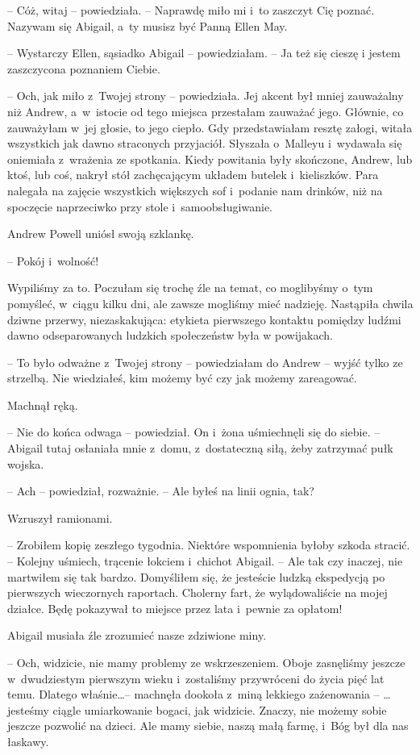 \documentclass[oneside,polish,11pt,sfheadings]{mwbk}
\begin{document}
-- Cóż, witaj -- powiedziała. -- Naprawdę miło mi i~to zaszczyt Cię poznać.
Nazywam się Abigail, a~ty musisz być Panną Ellen May.

-- Wystarczy Ellen, sąsiadko Abigail -- powiedziałam. -- Ja też się cieszę
i jestem zaszczycona poznaniem Ciebie.

-- Och, jak miło z~Twojej strony -- powiedziała. Jej akcent był mniej
zauważalny niż Andrew, a~w~istocie od tego miejsca przestałam zauważać
jego. Głównie, co zauważyłam w~jej głosie, to jego ciepło. Gdy
przedstawiałam resztę załogi, witała wszystkich jak dawno straconych
przyjaciół. Słyszała o~Malleyu i~wydawała się oniemiała z~wrażenia ze
spotkania. Kiedy powitania były skończone, Andrew, lub ktoś, lub coś,
nakrył stół zachęcającym układem butelek i~kieliszków. Para nalegała na
zajęcie wszystkich większych sof i~podanie nam drinków, niż na spoczęcie
naprzeciwko przy stole i~samoobsługiwanie.

Andrew Powell uniósł swoją szklankę. 

-- Pokój i~wolność!

Wypiliśmy za to. Poczułam się trochę źle na temat, co moglibyśmy o~tym
pomyśleć, w~ciągu kilku dni, ale zawsze mogliśmy mieć nadzieję.
Nastąpiła chwila dziwne przerwy, niezaskakująca: etykieta pierwszego
kontaktu pomiędzy ludźmi dawno odseparowanych ludzkich społeczeństw była
w powijakach.

-- To było odważne z~Twojej strony -- powiedziałam do Andrew -- wyjść tylko
ze strzelbą. Nie wiedziałeś, kim możemy być czy jak możemy zareagować.

Machnął ręką. 

-- Nie do końca odwaga -- powiedział. On i~żona uśmiechnęli
się do siebie. -- Abigail tutaj osłaniała mnie z~domu, z~dostateczną
siłą, żeby zatrzymać pułk wojska.

-- Ach -- powiedział, rozważnie. -- Ale byłeś na linii ognia, tak?

Wzruszył ramionami. 

-- Zrobiłem kopię zeszłego tygodnia. Niektóre
wspomnienia byłoby szkoda stracić. -- Kolejny uśmiech, trącenie łokciem i~chichot Abigail. -- Ale tak czy inaczej, nie martwiłem się tak bardzo.
Domyśliłem się, że jesteście ludzką ekspedycją po pierwszych wieczornych
raportach. Cholerny fart, że wylądowaliście na mojej działce. Będę
pokazywał to miejsce przez lata i~pewnie za opłatom!

Abigail musiała źle zrozumieć nasze zdziwione miny. 

-- Och, widzicie, nie
mamy problemy ze wskrzeszeniem. Oboje zasnęliśmy jeszcze w~dwudziestym
pierwszym wieku i~zostaliśmy przywróceni do życia pięć lat temu. Dlatego
właśnie\ldots  -- machnęła dookoła z~miną lekkiego zażenowania -- \ldots  jesteśmy
ciągle umiarkowanie bogaci, jak widzicie. Znaczy, nie możemy sobie
jeszcze pozwolić na dzieci. Ale mamy siebie, naszą małą farmę, i~Bóg był
dla nas łaskawy.
\end{document}

